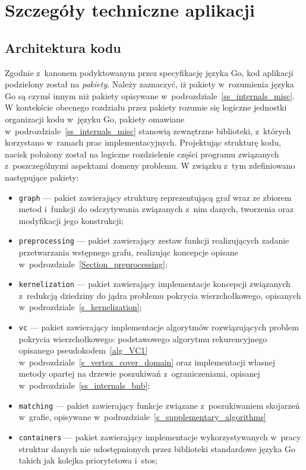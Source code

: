 \section{Szczegóły techniczne aplikacji}\label{s_internals_implementation}
\subsection{Architektura kodu}\label{ss_internals_architecture}
\par{
  Zgodnie z~kanonem podyktowanym przez specyfikację języka Go, kod aplikacji podzielony został na \emph{pakiety}.
  Należy zaznaczyć, iż pakiety w~rozumienia języka Go są czymś innym niż pakiety opisywane w~podrozdziale~\ref{ss_internals_misc}.
  W kontekście obecnego rozdziału przez pakiety rozumie się logiczne jednostki organizacji kodu w~języku Go, pakiety omawiane w~podrozdziale~\ref{ss_internals_misc} stanowią zewnętrzne biblioteki, z~których korzystano w~ramach prac implementacyjnych.
  Projektując strukturę kodu, nacisk położony został na logiczne rozdzielenie części programu związanych z~poszczególnymi aspektami domeny problemu.
  W związku z~tym zdefiniowano następujące pakiety:
  \begin{itemize}
    \item \texttt{graph} --- pakiet zawierający strukturę reprezentującą graf wraz ze zbiorem metod i~funkcji do odczytywania związanych z~nim danych, tworzenia oraz modyfikacji jego konstrukcji;
    \item \texttt{preprocessing} --- pakiet zawierający zestaw funkcji realizujących zadanie przetwarzania wstępnego grafu, realizując koncepcje opisane w~podrozdziale~\ref{Section_preprocessing};
    \item \texttt{kernelization} --- pakiet zawierający implementacje koncepcji związanych z~redukcją dziedziny do jądra problemu pokrycia wierzchołkowego, opisanych w~podrozdziale~\ref{s_kernelization};
    \item \texttt{vc} --- pakiet zawierający implementacje algorytmów rozwiązujących problem pokrycia wierzchołkowego: podstawowego algorytmu rekurencyjnego opisanego pseudokodem~\ref{alg_VC1} w~podrozdziale~\ref{s_vertex_cover_domain} oraz implementacji własnej metody opartej na drzewie poszukiwań z~ograniczeniami, opisanej w~podrozdziale~\ref{ss_internals_bnb};
    \item \texttt{matching} --- pakiet zawierający funkcje związane z~poszukiwaniem skojarzeń w~grafie, opisywane w~podrozdziale~\ref{s_supplementary_algorithms}
    \item \texttt{containers} --- pakiet zawierający implementacje wykorzystywanych w~pracy struktur danych nie udostępnionych przez biblioteki standardowe języka Go takich jak kolejka priorytetowa i~stos;

\end{itemize}}
